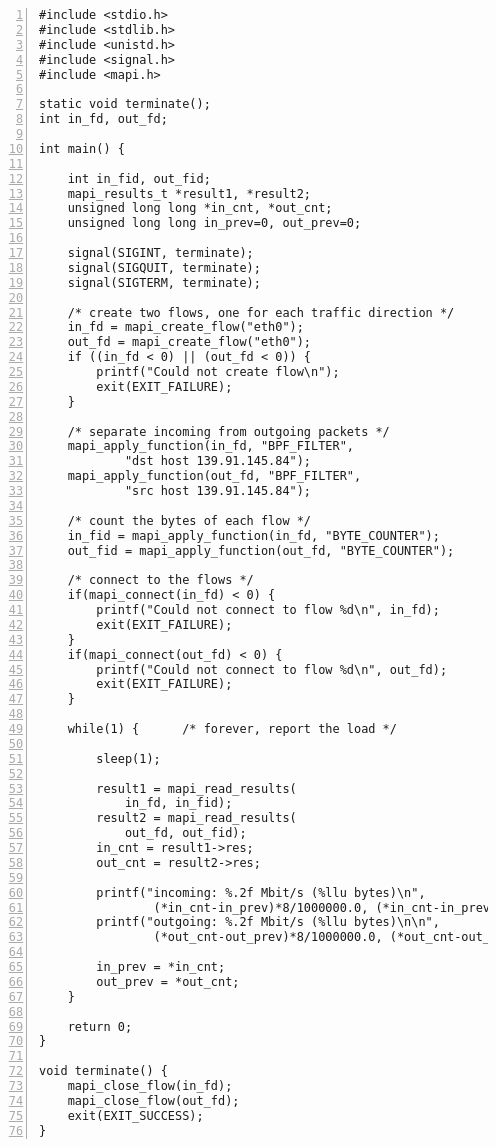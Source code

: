 \documentclass[a4paper, 11pt]{article}
\begin{document}
\begin{Verbatim}[numbersep=12pt, numbers=left, baselinestretch=1.0, fontsize=\small]
#include <stdio.h>
#include <stdlib.h>
#include <unistd.h>
#include <signal.h>
#include <mapi.h>

static void terminate();
int in_fd, out_fd;

int main() {

    int in_fid, out_fid;
    mapi_results_t *result1, *result2;
    unsigned long long *in_cnt, *out_cnt;
    unsigned long long in_prev=0, out_prev=0;
    
    signal(SIGINT, terminate);
    signal(SIGQUIT, terminate);
    signal(SIGTERM, terminate);

    /* create two flows, one for each traffic direction */
    in_fd = mapi_create_flow("eth0");
    out_fd = mapi_create_flow("eth0");
    if ((in_fd < 0) || (out_fd < 0)) {
        printf("Could not create flow\n");
        exit(EXIT_FAILURE);
    }

    /* separate incoming from outgoing packets */
    mapi_apply_function(in_fd, "BPF_FILTER",
            "dst host 139.91.145.84");
    mapi_apply_function(out_fd, "BPF_FILTER",
            "src host 139.91.145.84");
    
    /* count the bytes of each flow */
    in_fid = mapi_apply_function(in_fd, "BYTE_COUNTER");
    out_fid = mapi_apply_function(out_fd, "BYTE_COUNTER");

    /* connect to the flows */
    if(mapi_connect(in_fd) < 0) {
        printf("Could not connect to flow %d\n", in_fd);
        exit(EXIT_FAILURE);
    }
    if(mapi_connect(out_fd) < 0) {
        printf("Could not connect to flow %d\n", out_fd);
        exit(EXIT_FAILURE);
    } 
        
    while(1) {      /* forever, report the load */
        
        sleep(1);
      
        result1 = mapi_read_results(
            in_fd, in_fid);
        result2 = mapi_read_results(
            out_fd, out_fid);
        in_cnt = result1->res;
        out_cnt = result2->res;
  
        printf("incoming: %.2f Mbit/s (%llu bytes)\n",
                (*in_cnt-in_prev)*8/1000000.0, (*in_cnt-in_prev));
        printf("outgoing: %.2f Mbit/s (%llu bytes)\n\n",
                (*out_cnt-out_prev)*8/1000000.0, (*out_cnt-out_prev));

        in_prev = *in_cnt;
        out_prev = *out_cnt;
    }
    
    return 0;
}

void terminate() {
    mapi_close_flow(in_fd);
    mapi_close_flow(out_fd);
    exit(EXIT_SUCCESS);
}
\end{Verbatim}
\end{document}
